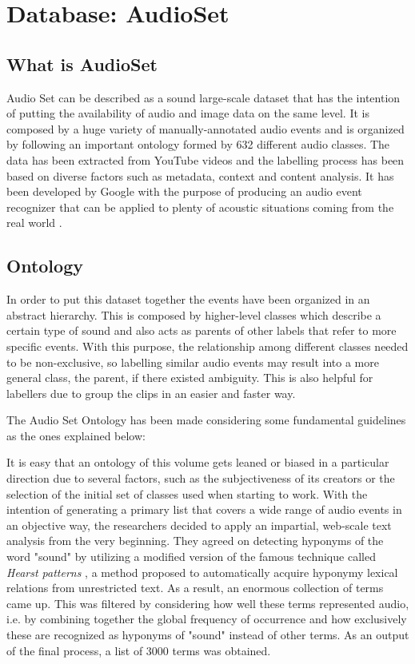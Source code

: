 
\section{Database: AudioSet}
\label{section:audioset}

\subsection{What is AudioSet} 

	Audio Set can be described as a sound large-scale dataset that has the intention of putting the availability of audio and image data on the same level. It is composed by a huge variety of manually-annotated audio events and is organized by following an important ontology formed by 632 different audio classes. The data has been extracted from YouTube videos and the labelling process has been based on diverse factors such as metadata, context and content analysis. It has been developed by Google with the purpose of producing an audio event recognizer that can be applied to plenty of acoustic situations coming from the real world \cite{Gemmeke2017}.
	
\subsection{Ontology}
\label{subsecition:ontology}

	In order to put this dataset together the events have been organized in an abstract hierarchy. This is composed by higher-level classes which  describe a certain type of sound and also acts as parents of other labels that refer to more specific events. With this purpose, the relationship among different classes needed to be non-exclusive, so labelling similar audio events may result into a more general class, the parent, if there existed ambiguity. This is also helpful for labellers due to group the clips in an easier and faster way.
	
	The Audio Set Ontology has been made considering some fundamental guidelines as the ones explained below:
	
	
	It is easy that an ontology of this volume gets leaned or biased in a particular direction due to several factors, such as the subjectiveness of its creators or the selection of the initial set of classes used when starting to work. With the intention of generating a primary list that covers a wide range of audio events in an objective way, the researchers decided to apply an impartial, web-scale text analysis from the very beginning. They agreed on detecting hyponyms of the word "sound" by utilizing a modified version of the famous technique called \textit{Hearst patterns} \cite{Hearst1992}, a method proposed to automatically acquire hyponymy lexical relations from unrestricted text. As a result, an enormous collection of terms came up. This was filtered by considering how well these terms represented audio, i.e. by combining together the global frequency of occurrence and how exclusively these are recognized as hyponyms of "sound" instead of other terms. As an output of the final process, a list of 3000 terms was obtained.
	
